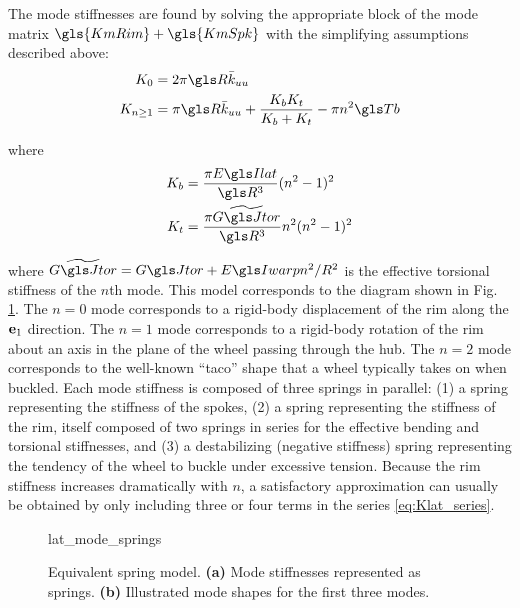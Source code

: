 \documentclass[\rootdir/thesis.tex]{subfiles}
\begin{document}
The mode stiffnesses are found by solving the appropriate block of the mode matrix $\gls{KmRim} + \gls{KmSpk}$ with the simplifying assumptions described above:
\begin{subequations}\label{eq:Kn}
\begin{align}
K_0 &= 2\pi\R\kuu \label{eq:Kn_0}\\
K_{n\geq1} & = \pi\R\kuu + \frac{\Kbend \Ktors}{\Kbend + \Ktors} - \pi n^2 \Tb \label{eq:Kn_n}
\end{align}
\end{subequations}

where
\begin{align*}
\Kbend &= \frac{\pi \EIl}{\R^3} (n^2-1)^2\\
\Ktors &= \frac{\pi \widetilde{\GJ}}{\R^3}n^2(n^2-1)^2
\end{align*}

where $\widetilde{\GJ} = \GJ + \EIw n^2/R^2$ is the effective torsional stiffness of the $n$th mode. This model corresponds to the diagram shown in Fig. \ref{fig:lat_mode_springs}. The $n=0$ mode corresponds to a rigid-body displacement of the rim along the $\mathbf{e}_1$ direction. The $n=1$ mode corresponds to a rigid-body rotation of the rim about an axis in the plane of the wheel passing through the hub. The $n=2$ mode corresponds to the well-known ``taco'' shape that a wheel typically takes on when buckled. Each mode stiffness is composed of three springs in parallel: (1) a spring representing the stiffness of the spokes, (2) a spring representing the stiffness of the rim, itself composed of two springs in series for the effective bending and torsional stiffnesses, and (3) a destabilizing (negative stiffness) spring representing the tendency of the wheel to buckle under excessive tension. Because the rim stiffness increases dramatically with $n$, a satisfactory approximation can usually be obtained by only including three or four terms in the series \eqref{eq:Klat_series}.

\begin{figure}[t]
\centering
{lat_mode_springs}
\caption{Equivalent spring model. \textbf{(a)} Mode stiffnesses represented as springs. \textbf{(b)} Illustrated mode shapes for the first three modes.}
\label{fig:lat_mode_springs}
\end{figure}
\end{document}
